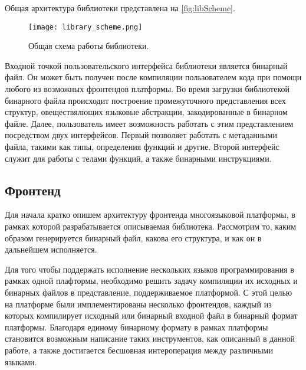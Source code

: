 Общая архитектура библиотеки представлена на \autoref{fig:libScheme}.

\begin{figure}[h]
\centering
\texttt{[image: library\_scheme.png]}
\caption{Общая схема работы библиотеки.}
\label{fig:libScheme}
\end{figure}

Входной точкой пользовательского интерфейса библиотеки является бинарный файл. Он может быть получен после компиляции пользователем кода при помощи любого из возможных фронтендов платформы. Во время загрузки библиотекой бинарного файла происходит построение промежуточного представления всех структур, овеществялющих языковые абстракции, закодированные в бинарном файле. Далее, пользователь имеет возможность работать с этим представлением посредством двух интерфейсов. Первый позволяет работать с метаданными файла, такими как типы, определения функций и другие. Второй интерфейс служит для работы с телами функций, а также бинарными инструкциями.

\subsection{Фронтенд}

Для начала кратко опишем архитектуру фронтенда многоязыковой платформы, в рамках которой разрабатывается описываемая библиотека. Рассмотрим то, каким образом генерируется бинарный файл, какова его структура, и как он в дальнейшем исполняется.

Для того чтобы поддержать исполнение нескольких языков программирования в рамках одной плафтормы, необходимо решить задачу компиляции их исходных и бинарных файлов в представление, поддерживаемое платформой. С этой целью на платформе были имплементированы несколько фронтендов, каждый из которых компилирует исходный или бинарный входной файл в бинарный формат платформы. Благодаря единому бинарному формату в рамках платформы становится возможным написание таких инструментов, как описанный в данной работе, а также достигается бесшовная интероперация между различными языками.

